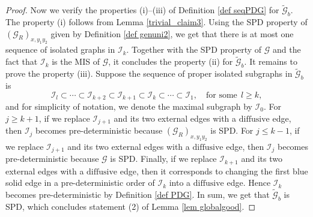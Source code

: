 \documentclass{article}
\newcommand{\1}{\mathds{1}}
\numberwithin{equation}{section}
\newcommand{\be}{\begin{equation}}
\newcommand{\ee}{\end{equation}}
\renewcommand{\cal}{\mathcal}
\newcommand{\wt}{\widetilde}
\renewcommand{\leq}{\leqslant}
\renewcommand{\geq}{\geqslant}
\renewcommand{\le}{\leq}
\renewcommand{\ge}{\geq}
\newcommand{\dashed}{\text{diffusive}}
\theoremstyle{plain} %
\theoremstyle{remark}
\newcommand{\Iso}{{\mathcal I}}
\begin{document}
\begin{proof}


Now we verify the properties (i)--(iii) of Definition \ref{def seqPDG} for $\wt{\cal G}_b$. The property (i) follows from Lemma \ref{trivial_claim3}. 
Using the SPD property of $(\cal G_{R})_{x,y_1y_2}$ given by Definition \ref{def genuni2}, we get that there is at most one sequence of isolated graphs in $\Iso_k$. Together with the SPD property of $\cal G$ and the fact that $\Iso_k$ is the MIS of $\cal G$, it concludes the property (ii) for $\wt{\cal G}_b$. 
It remains to prove the property (iii). Suppose the sequence of proper isolated subgraphs in $\wt{\cal G}_b$ is 
\be\label{pf_chain_iso}\Iso_{l}\subset \cdots \subset \Iso_{k+2}\subset \Iso_{k+1} \subset  \Iso_k \subset \cdots \subset \Iso_1,\quad \text{for some} \ \ l\ge k,\ee
and for simplicity of notation, we denote the maximal subgraph by $\Iso_0$.   
For $j\ge k+1$, if we replace $\Iso_{j+1}$ and its two external edges with a $\dashed$ edge, then $\Iso_j$ becomes pre-deterministic because $(\cal G_{R})_{x,y_1y_2}$ is SPD. %
For $j\le k-1$, if we replace $\Iso_{j+1}$ and its two external edges with a $\dashed$ edge, then $\Iso_j$ becomes pre-deterministic because $\cal G$ is SPD. Finally, if we replace $\Iso_{k+1}$ and its two external edges with a $\dashed$ edge, then it corresponds to changing the first blue solid edge in a pre-deterministic order of $\Iso_k$ into a $\dashed$ edge. Hence $\Iso_k$ becomes pre-deterministic by Definition \ref{def PDG}. In sum, we get that $\wt{\cal G}_b$ is SPD, which concludes statement (2) of Lemma \ref{lem globalgood}. 


\end{proof}
\end{document}
